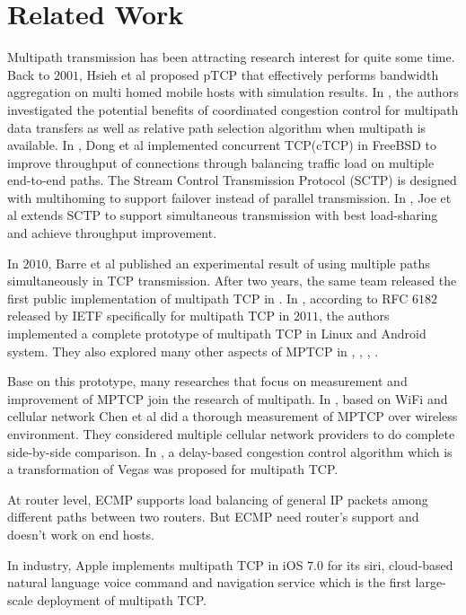 \section{Related Work}
\label{sec:related}
Multipath transmission has been attracting research interest for quite some time. Back to $2001$, Hsieh et al proposed pTCP\cite{hsieh01} that effectively performs bandwidth aggregation on multi homed mobile hosts with simulation results. In \cite{key01}, the authors investigated the potential benefits of coordinated congestion control for multipath data transfers as well as relative path selection algorithm when multipath is available. In \cite{dong01}, Dong et al implemented concurrent TCP(cTCP) in FreeBSD to improve throughput of connections through balancing traffic load on multiple end-to-end paths. The Stream Control Transmission Protocol (SCTP)\cite{sctp} is designed with multihoming to support failover instead of parallel transmission. In \cite{joe01}, Joe et al extends SCTP to support simultaneous transmission with best load-sharing and achieve throughput improvement.

In $2010$, Barre et al published an experimental result of using multiple paths simultaneously in TCP transmission\cite{BRBH10}. After two years, the same team released the first public implementation of multipath TCP in \cite{mptcp}. In \cite{mptcp}, according to RFC $6182$ released by IETF specifically for multipath TCP in $2011$, the authors implemented a complete prototype of multipath TCP in Linux and Android system. They also explored many other aspects of MPTCP in \cite{PDDRB12}, \cite{DPLMAB13}, \cite{PKB13}, \cite{PFAB14}.

Base on this prototype, many researches that focus on measurement and improvement of MPTCP join the research of multipath. In \cite{chen01}, based on WiFi and cellular network Chen et al did a thorough measurement of MPTCP over wireless environment. They considered multiple cellular network providers to do complete side-by-side comparison. In \cite{cao01}, a delay-based congestion control algorithm which is a transformation of Vegas\cite{vegas} was proposed for multipath TCP.

At router level, ECMP\cite{ecmp} supports load balancing of general IP packets among different paths between two routers. But ECMP need router's support and doesn't work on end hosts.

In industry, Apple\cite{apple} implements multipath TCP in iOS $7.0$ for its siri, cloud-based natural language voice command and navigation service which is the first large-scale deployment of multipath TCP.